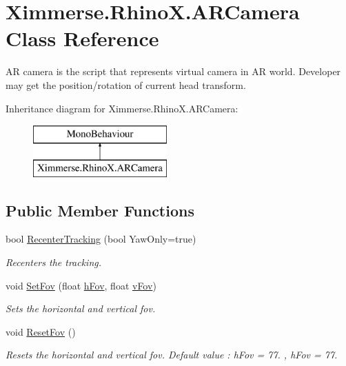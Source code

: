 \hypertarget{class_ximmerse_1_1_rhino_x_1_1_a_r_camera}{}\section{Ximmerse.\+Rhino\+X.\+A\+R\+Camera Class Reference}
\label{class_ximmerse_1_1_rhino_x_1_1_a_r_camera}


AR camera is the script that represents virtual camera in AR world. Developer may get the position/rotation of current head transform.  


Inheritance diagram for Ximmerse.\+Rhino\+X.\+A\+R\+Camera\+:\begin{figure}[H]
\begin{center}
\leavevmode
\includegraphics[height=2.000000cm]{class_ximmerse_1_1_rhino_x_1_1_a_r_camera}
\end{center}
\end{figure}
\subsection*{Public Member Functions}
\begin{DoxyCompactItemize}
\item 
bool \mbox{\hyperlink{class_ximmerse_1_1_rhino_x_1_1_a_r_camera_a4b8e8609b5b3c5cc7e9722be7e11caff}{Recenter\+Tracking}} (bool Yaw\+Only=true)
\begin{DoxyCompactList}\small\item\em Recenters the tracking. \end{DoxyCompactList}\item 
void \mbox{\hyperlink{class_ximmerse_1_1_rhino_x_1_1_a_r_camera_aefc6422a8587e8769e5e224c2ce66148}{Set\+Fov}} (float \mbox{\hyperlink{class_ximmerse_1_1_rhino_x_1_1_a_r_camera_ace7c430868896aa5cc911f023a0c4ec2}{h\+Fov}}, float \mbox{\hyperlink{class_ximmerse_1_1_rhino_x_1_1_a_r_camera_a386210a7a33ca8df7dd6fd8e0530bb55}{v\+Fov}})
\begin{DoxyCompactList}\small\item\em Sets the horizontal and vertical fov. \end{DoxyCompactList}\item 
void \mbox{\hyperlink{class_ximmerse_1_1_rhino_x_1_1_a_r_camera_a8990c22f1fd7eadc81fc8cce26e307ad}{Reset\+Fov}} ()
\begin{DoxyCompactList}\small\item\em Resets the horizontal and vertical fov. Default value \+: h\+Fov = 77. , h\+Fov = 77. \end{DoxyCompactList}\end{DoxyCompactItemize}
